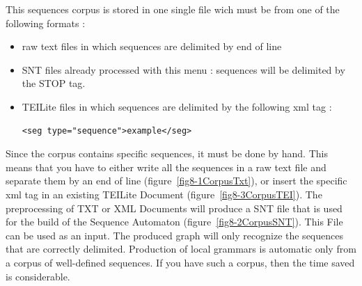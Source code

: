 This sequences corpus is stored in one single file wich must be from one of the following formats :
\begin{itemize}
	\item raw text files in which sequences are delimited by end of line 
	\item SNT files already processed with this menu : sequences will be delimited by the {STOP} tag.
	\item TEILite files in which sequences are delimited by the following xml tag :	
		\begin{verbatim}<seg type="sequence">example</seg>
		\end{verbatim}
\end{itemize}
\pagebreak 
\indent Since the corpus contains specific sequences, it must be done by hand. This means that you have to either write all the sequences in a raw text file and separate them by an end  of line (figure~\ref{fig8-1CorpusTxt}), or insert the specific xml tag in an existing TEILite Document (figure~\ref{fig8-3CorpusTEI}). The preprocessing of TXT or XML Documents will produce a SNT file that is used for the build of the Sequence Automaton (figure~\ref{fig8-2CorpusSNT}). This File can be used as an input. The produced graph will only recognize the sequences that are correctly delimited. Production of local grammars is automatic only from a corpus of well-defined sequences. If you have such a corpus, then the time saved is considerable.

